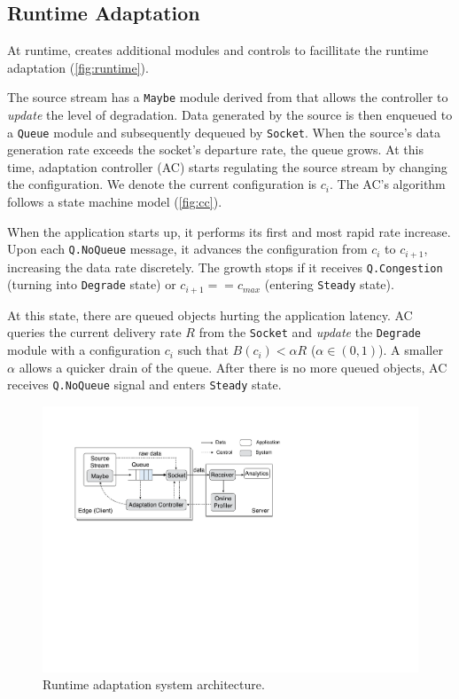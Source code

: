 \subsection{Runtime Adaptation}
\label{sec:runtime}

At runtime, \sysname{} creates additional modules and controls to facillitate
the runtime adaptation (\autoref{fig:runtime}).

The source stream has a \texttt{Maybe} module derived from \maybe{} that allows
the controller to \textit{update} the level of degradation. Data generated by
the source is then enqueued to a \texttt{Queue} module and subsequently dequeued
by \texttt{Socket}. When the source's data generation rate exceeds the socket's
departure rate, the queue grows. At this time, adaptation controller (AC) starts
regulating the source stream by changing the configuration. We denote the
current configuration is $c_i$. The AC's algorithm follows a state machine model
(\autoref{fig:cc}).

 When the application starts up, it performs its
first and most rapid rate increase. Upon each \texttt{Q.NoQueue} message, it
advances the configuration from $c_i$ to $c_{i+1}$, increasing the data rate
discretely. The growth stops if it receives \texttt{Q.Congestion} (turning into
\texttt{Degrade} state) or $c_{i+1} == c_{max}$ (entering \texttt{Steady}
state).

 At this state, there are queued objects
hurting the application latency. AC queries the current delivery rate $R$ from
the \texttt{Socket} and \textit{update} the \texttt{Degrade} module with a
configuration $c_i$ such that $B(c_i) < \alpha R$ ($\alpha \in (0, 1)$). A
smaller $\alpha$ allows a quicker drain of the queue. After there is no more
queued objects, AC receives \texttt{Q.NoQueue} signal and enters \texttt{Steady}
state.

\begin{figure}
  \centering
  \includegraphics[width=\linewidth]{figures/runtime-adaptation.pdf}
  \caption{Runtime adaptation system architecture.}
  \label{fig:runtime}
\end{figure}

